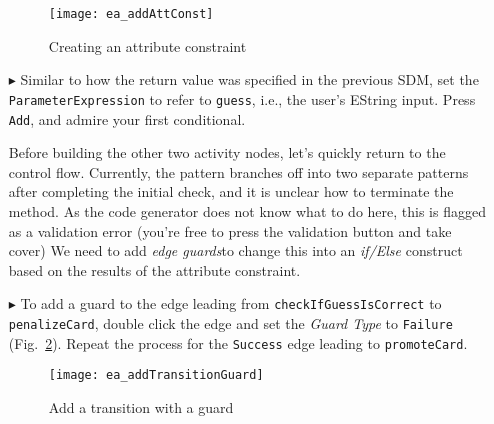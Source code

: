 \begin{itemize}
\vspace{0.5cm}

\begin{figure}[htbp]
\begin{center}
  \texttt{[image: ea\_addAttConst]}
  \caption{Creating an attribute constraint}
  \label{fig:sdmcheck_att_constraint}
\end{center}
\end{figure}

\item[$\blacktriangleright$] Similar to how the return value was specified in the previous SDM, set the \texttt{ParameterExpression} to refer to \texttt{guess},
i.e., the user's EString input. Press \texttt{Add}, and admire your first conditional.

\vspace{0.5cm}

Before building the other two activity nodes, let's quickly return to the control flow. Currently, the pattern branches off into two separate patterns after
completing the initial check, and it is unclear how to terminate the method. As the code generator does not know what to do here, this is flagged as a
validation error (you're free to press the validation button and take cover) We need to add \emph{edge guards}to change this into an
\emph{if/Else} construct based on the results of the attribute constraint.

\newpage

\item[$\blacktriangleright$] To add a guard to the edge leading from \texttt{check\-If\-Guess\-Is\-Correct} to \texttt{penalize\-Card}, double click the edge
and set the \emph{Guard Type} to \texttt{Failure} (Fig.~\ref{fig:sdm_check_guard}). Repeat the process for the \texttt{Success} edge leading to
\texttt{promoteCard}.

\vspace{0.5cm}

\begin{figure}[htbp]
\begin{center}
  \texttt{[image: ea\_addTransitionGuard]}
  \caption{Add a transition with a guard}
  \label{fig:sdm_check_guard}
\end{center}
\end{figure}

\vspace{0.5cm}


\end{itemize}
